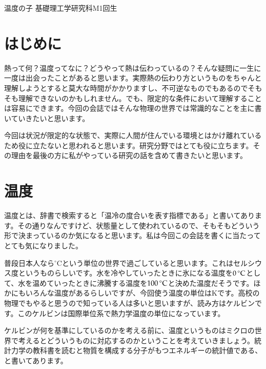 \documentclass[10pt,b5paper,papersize,dvipdfmx]{jsbook}
\begin{document}

\newcommand\degreeCelsius{{}^\circ\mathrm{C}} %


\kaishititle%
  {温度の子}%
  {基礎理工学研究科M1回生}%
  {}%


\section*{はじめに}
熱って何？温度ってなに？どうやって熱は伝わっているの？そんな疑問に一生に一度は出会ったことがあると思います。実際熱の伝わり方というものをちゃんと理解しようとすると莫大な時間がかかりますし、不可逆なものでもあるのでそもそも理解できないのかもしれません。でも、限定的な条件において理解することは容易にできます。今回の会誌ではそんな物理の世界では常識的なことを主に書いていきたいと思います。\par
今回は状況が限定的な状態で、実際に人間が住んでいる環境とはかけ離れているため役に立たないと思われると思います。研究分野ではとても役に立ちます。その理由を最後の方に私がやっている研究の話を含めて書きたいと思います。


%
\section{温度}
温度とは、辞書で検索すると「温冷の度合いを表す指標である」と書いてあります。その通りなんですけど、状態量として使われているので、そもそもどういう形で決まっているのか気になると思います。私は今回この会誌を書くに当たってとても気になりました。\par 
普段日本人なら$\degreeCelsius$という単位の世界で過ごしていると思います。これはセルシウス度というものらしいです。水を冷やしていったときに氷になる温度を$0\tani{\degreeCelsius}$として、水を温めていったときに沸騰する温度を$100\tani{\degreeCelsius}$と決めた温度だそうです。ほかにもいろんな温度があるらしいですが、今回使う温度の単位は$\mathrm{K}$です。高校の物理でもやると思うので知っている人は多いと思いますが、読み方はケルビンです。このケルビンは国際単位系で熱力学温度の単位になっています。\par

ケルビンが何を基準にしているのかを考える前に、温度というものはミクロの世界で考えるとどういうものに対応するのかということを考えていきましょう。統計力学の教科書を読むと物質を構成する分子がもつエネルギーの統計値である、と書いてあります。\par
\end{document}
